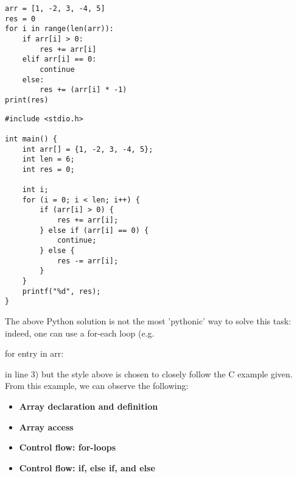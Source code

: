 \noindent
\begin{minipage}{0.40\textwidth}
\begin{verbatim}
arr = [1, -2, 3, -4, 5]
res = 0
for i in range(len(arr)):
    if arr[i] > 0:
        res += arr[i]
    elif arr[i] == 0:
        continue
    else:
        res += (arr[i] * -1)
print(res)
\end{verbatim}
\end{minipage}
\hfill
\begin{minipage}{0.40\textwidth}
\begin{verbatim}
#include <stdio.h>

int main() {
    int arr[] = {1, -2, 3, -4, 5};
    int len = 6;
    int res = 0;
    
    int i;
    for (i = 0; i < len; i++) {
        if (arr[i] > 0) {
            res += arr[i];
        } else if (arr[i] == 0) {
            continue;
        } else {
            res -= arr[i];
        }
    }
    printf("%d", res);
}
\end{verbatim}
\end{minipage}


The above Python solution is not the most 'pythonic' way to solve this task: indeed, one can use a for-each loop (e.g. \begin{typewriter}for entry in arr:\end{typewriter} in line 3) but the style above is chosen to closely follow the C example given. From this example, we can observe the following:

\begin{itemize}
    \item \textbf{Array declaration and definition}
    \item \textbf{Array access}
    \item \textbf{Control flow: for-loops}
    \item \textbf{Control flow: if, else if, and else}
\end{itemize}